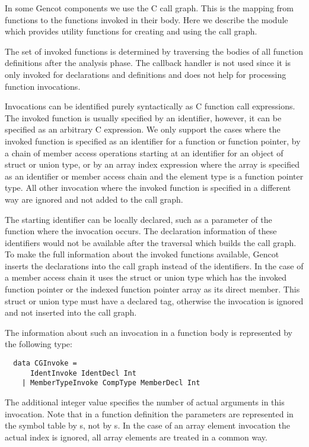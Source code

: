 In some Gencot components we use the C call graph. This is the mapping from functions to the functions
invoked in their body. Here we describe the module  which provides
utility functions for creating and using the call graph.

The set of invoked functions is determined by traversing the bodies of all function definitions after the analysis
phase. The callback handler is not used since it is only invoked for declarations and definitions and does not help
for processing function invocations.

Invocations can be identified purely syntactically as C function call expressions. The invoked function is usually 
specified by an identifier, however, it can be specified as an arbitrary C expression. We only support the cases
where the invoked function is specified as an identifier for a function or function pointer, by a chain of 
member access operations starting at an identifier for an object of struct or union type, or by an array index
expression where the array is specified as an identifier or member access chain and the element type is a function
pointer type. All other invocation where the invoked function is specified in a different way are ignored and not 
added to the call graph.

The starting identifier can be locally declared, such as a parameter of the function where the invocation occurs. The 
declaration information of these identifiers would not be available after the traversal which builds the call graph.
To make the full information about the invoked functions available, Gencot inserts the declarations into the call graph 
instead of the identifiers. In the case of a member access chain it uses the struct or union type which has the 
invoked function pointer or the indexed function pointer array as its direct member. This struct or union type
must have a declared tag, otherwise the invocation is ignored and not inserted into the call graph.

The information about such an invocation in a function body is represented by the following type:
\begin{verbatim}
  data CGInvoke =
      IdentInvoke IdentDecl Int
    | MemberTypeInvoke CompType MemberDecl Int
\end{verbatim}
The additional integer value specifies the number of actual arguments in this invocation.
Note that in a function definition
the parameters are represented in the symbol table by s, not by s. In the case
of an array element invocation the actual index is ignored, all array elements are treated in a common way.

